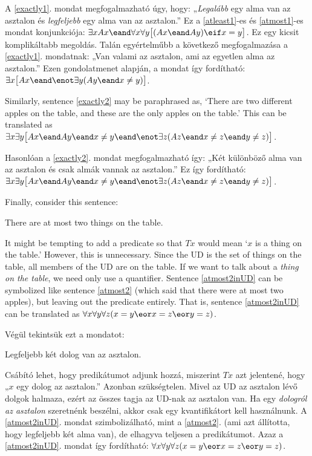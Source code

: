 A \ref{exactly1}. mondat megfogalmazható úgy, hogy: „\emph{Legalább} egy alma van az asztalon és \emph{legfeljebb} egy alma van az asztalon.” Ez a \ref{atleast1}-es és \ref{atmost1}-es mondat konjunkciója: $\exists x Ax \eand \forall x\forall y\bigl[(Ax \eand Ay) \eif x=y\bigr]$. Ez egy kicsit komplikáltabb megoldás. Talán egyértelműbb a következő megfogalmazása a \ref{exactly1}. mondatnak: „Van valami az asztalon, ami az egyetlen alma az asztalon.” Ezen gondolatmenet alapján, a mondat így fordítható: $\exists x\bigl[Ax \eand \enot\exists y(Ay \eand x\neq y)\bigr]$.

Similarly, sentence \ref{exactly2} may be paraphrased as, `There are two different apples on the table, and these are the only apples on the table.' This can be translated as $\exists x\exists y\bigl[Ax \eand Ay \eand x\neq y \eand \enot\exists z(Az \eand x\neq z \eand y\neq z)\bigr]$.

Hasonlóan a \ref{exactly2}. mondat megfogalmazható így: „Két különböző alma van az asztalon és csak almák vannak az asztalon.” Ez így fordítható: $\exists x\exists y\bigl[Ax \eand Ay \eand x\neq y \eand \enot\exists z(Az \eand x\neq z \eand y\neq z)\bigr]$.

Finally, consider this sentence:
\begin{earg}
\item[\ex{atmost2inUD}] There are at most two things on the table.
\end{earg}
It might be tempting to add a predicate so that $Tx$ would mean `$x$ is a thing on the table.' However, this is unnecessary. Since the UD is the set of things on the table, all members of the UD are on the table. If we want to talk about a \emph{thing on the table}, we need only use a quantifier. Sentence \ref{atmost2inUD} can be symbolized like sentence \ref{atmost2} (which said that there were at most two apples), but leaving out the predicate entirely. That is, sentence \ref{atmost2inUD} can be translated as $\forall x \forall y \forall z(x=y \eor x=z \eor y=z)$.

Végül tekintsük ezt a mondatot:
\begin{earg}
\item[\ex{atmost2inUD}] Legfeljebb két dolog van az asztalon.
\end{earg}
Csábító lehet, hogy predikátumot adjunk hozzá, miszerint $Tx$ azt jelentené, hogy „$x$ egy dolog az asztalon.” Azonban szükségtelen. Mivel az UD az asztalon lévő dolgok halmaza, ezért az összes tagja az UD-nak az asztalon van. Ha egy \emph{dologról az asztalon} szeretnénk beszélni, akkor csak egy kvantifikátort kell használnunk. A \ref{atmost2inUD}. mondat szimbolizálható, mint a \ref{atmost2}. (ami azt állította, hogy legfeljebb két alma van), de elhagyva teljesen a predikátumot. Azaz a \ref{atmost2inUD}. mondat így fordítható: $\forall x \forall y \forall z(x=y \eor x=z \eor y=z)$.

